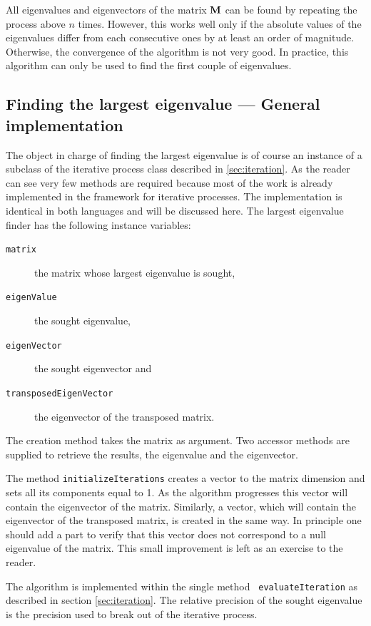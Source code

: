\documentclass[twoside]{book}
\begin{document}
All eigenvalues and eigenvectors of the matrix ${\bf M}$ can be
found by repeating the process above $n$ times. However, this
works well only if the absolute values of the eigenvalues differ
from each consecutive ones by at least an order of magnitude.
Otherwise, the convergence of the algorithm is not very good. In
practice, this algorithm can only be used to find the first couple
of eigenvalues.

\subsection{Finding the largest eigenvalue --- General
implementation} The object in
charge of finding the largest eigenvalue is of course an instance
of a subclass of the iterative process class described in
\ref{sec:iteration}. As the reader can see very few methods are
required because most of the work is already implemented in the
framework for iterative processes. The implementation is identical
in both languages and will be discussed here. The largest
eigenvalue finder has the following instance variables:
\begin{description}
  \item[\tt matrix] the matrix whose largest eigenvalue is sought,
  \item[\tt eigenValue] the sought eigenvalue,
  \item[\tt eigenVector] the sought eigenvector and
  \item[\tt transposedEigenVector] the eigenvector of the
  transposed matrix.
\end{description}
The creation method takes the matrix as argument. Two accessor
methods are supplied to retrieve the results, the eigenvalue and
the eigenvector.

The method {\tt initializeIterations} creates a vector to the
matrix dimension and sets all its components equal to 1. As the
algorithm progresses this vector will contain the eigenvector of
the matrix. Similarly, a vector, which will contain the
eigenvector of the transposed matrix, is created in the same way.
In principle one should add a part to verify that this vector does
not correspond to a null eigenvalue of the matrix. This small
improvement is left as an exercise to the reader.

The algorithm is implemented within the single method {\tt
evaluateIteration} as described in section \ref{sec:iteration}.
The relative precision of the sought eigenvalue is the precision
used to break out of the iterative process.
\end{document}
